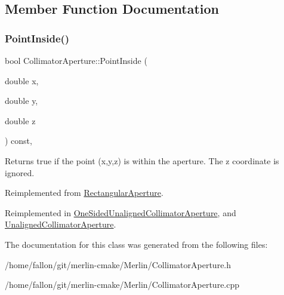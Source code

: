 \subsection{Member Function Documentation}
\mbox{\label{classCollimatorAperture_a964f63287a0ab48900859d75dfa644dc}} 
\subsubsection{\texorpdfstring{Point\+Inside()}{PointInside()}}
{\footnotesize\ttfamily bool Collimator\+Aperture\+::\+Point\+Inside (\begin{DoxyParamCaption}\item[{double}]{x,  }\item[{double}]{y,  }\item[{double}]{z }\end{DoxyParamCaption}) const\hspace{0.3cm}{\ttfamily [inline]}, {\ttfamily [virtual]}}

Returns true if the point (x,y,z) is within the aperture. The z coordinate is ignored. 

Reimplemented from \hyperlink{classRectangularAperture_a47e965df14eb63f2a3851ea0e9fe26db}{Rectangular\+Aperture}.



Reimplemented in \hyperlink{classOneSidedUnalignedCollimatorAperture_afad818345b971dffa9ca6fa36a166e35}{One\+Sided\+Unaligned\+Collimator\+Aperture}, and \hyperlink{classUnalignedCollimatorAperture_af116c2ff1d60c4894a9b9ae4cfc2b19e}{Unaligned\+Collimator\+Aperture}.



The documentation for this class was generated from the following files\+:\begin{DoxyCompactItemize}
\item 
/home/fallon/git/merlin-\/cmake/\+Merlin/Collimator\+Aperture.\+h\item 
/home/fallon/git/merlin-\/cmake/\+Merlin/Collimator\+Aperture.\+cpp\end{DoxyCompactItemize}
